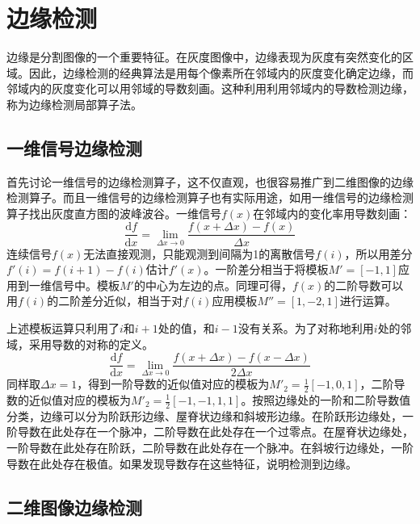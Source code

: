 \section{边缘检测}\label{sec:edge}

边缘是分割图像的一个重要特征。在灰度图像中，边缘表现为灰度有突然变化的区域。因此，边缘检测的经典算法是用每个像素所在邻域内的灰度变化确定边缘，而邻域内的灰度变化可以用邻域的导数刻画。这种利用利用邻域内的导数检测边缘，称为边缘检测局部算子法。

\subsection{一维信号边缘检测}\label{sec:edge1d}

首先讨论一维信号的边缘检测算子，这不仅直观，也很容易推广到二维图像的边缘检测算子。而且一维信号的边缘检测算子也有实际用途，如用一维信号的边缘检测算子找出灰度直方图的波峰波谷。一维信号$f(x)$在邻域内的变化率用导数刻画：
\begin{equation}
  \label{eq:diff}
  \frac{\mathrm{d}f}{\mathrm{d}x}=\lim_{\Delta x\to 0}\frac{f(x+\Delta x)-f(x)}{\Delta x}
\end{equation}
连续信号$f(x)$无法直接观测，只能观测到间隔为1的离散信号$f(i)$，所以用差分$f'(i)=f(i+1)-f(i)$估计$f'(x)$。一阶差分相当于将模板$M'=[-1,1]$应用到一维信号中。模板$M'$的中心为左边的点。同理可得，$f(x)$的二阶导数可以用$f(i)$的二阶差分近似，相当于对$f(i)$应用模板$M''=[1,-2,1]$进行运算。

上述模板运算只利用了$i$和$i+1$处的值，和$i-1$没有关系。为了对称地利用$i$处的邻域，采用导数的对称的定义。
\begin{equation}
  \label{eq:diff2}
  \frac{\mathrm{d}f}{\mathrm{d}x}=\lim_{\Delta x\to 0}\frac{f(x+\Delta x)-f(x-\Delta x)}{2\Delta x}
\end{equation}
同样取$\Delta x=1$，得到一阶导数的近似值对应的模板为$M'_2=\frac{1}{2}[-1,0,1]$，二阶导数的近似值对应的模板为$M'_2=\frac{1}{2}[-1,-1,1,1]$。按照边缘处的一阶和二阶导数值分类，边缘可以分为阶跃形边缘、屋脊状边缘和斜坡形边缘。在阶跃形边缘处，一阶导数在此处存在一个脉冲，二阶导数在此处存在一个过零点。在屋脊状边缘处，一阶导数在此处存在阶跃，二阶导数在此处存在一个脉冲。在斜坡行边缘处，一阶导数在此处存在极值。如果发现导数存在这些特征，说明检测到边缘。

\subsection{二维图像边缘检测}\label{sec:edge2d}

